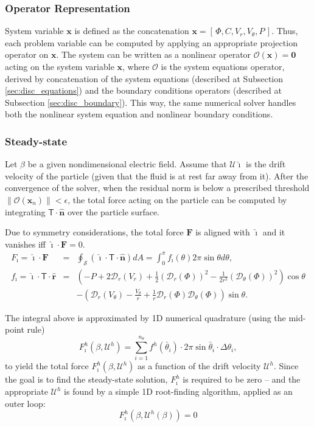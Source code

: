 \documentclass[10pt]{ijnam}
\newcommand{\pars}[1]{\left(#1\right)}
\newcommand\bn{\boldsymbol{\hat{n}}}
\newcommand\bF{\boldsymbol{F}}
\newcommand\bx{\boldsymbol{x}}
\newcommand\br{\boldsymbol{r}}
\newcommand\brhat{\hat{\br}}
\newcommand\bnhat{\hat{\boldsymbol{n}}}
\newcommand\bzero{\boldsymbol{0}}
\newcommand\cO{\mathcal{O}}
\newcommand\cD{\mathcal{D}}
\newcommand\cU{\mathscr{U}}
\newcommand\tT{\mathsf{T}}
\newcommand\ui{\boldsymbol{\hat{\imath}}}
\begin{document}
\subsubsection{Operator Representation}
System variable $\bx$ is defined as the concatenation $\bx = [\,\varPhi, C, V_r, V_\theta, P\,]$.
Thus, each problem variable can be computed by applying an appropriate projection operator on $\bx$.
The system can be written as a nonlinear operator $\cO(\bx) = \bzero$ 
acting on the system variable ${\bx}$, 
where $\cO$ is the system equations operator, 
derived by concatenation of the system equations (described at Subsection \ref{sec:disc_equations})
and the boundary conditions operators (described at Subsection \ref{sec:disc_boundary}).
This way, the same numerical solver handles both the nonlinear system equation and nonlinear
boundary conditions.

\subsubsection{Steady-state}
Let $\beta$ be a given nondimensional electric field.
Assume that $\cU \ui$ is the drift velocity of the particle 
(given that the fluid is at rest far away from it).
After the convergence of the solver, when the residual norm is below
a prescribed threshold $\|\cO(\bx_n)\| < \epsilon$, 
the total force acting on the particle  
can be computed by integrating $\tT \cdot \bn$ over the particle surface.

Due to symmetry considerations, the total force $\bF$ is 
aligned with $\ui$ and it vanishes iff $\ui \cdot \bF = 0$.
\begin{eqnarray} \nonumber
F_\imath = \ui \cdot \bF &=& 
\oint_\mathcal{S} \pars{\ui \cdot \tT \cdot \bnhat} dA = 
\int_0^\pi f_\imath(\theta) 2\pi \sin\theta d\theta ,
\\  
f_\imath = \ui \cdot \tT \cdot \brhat &=& \pars{-P + 2\cD_r(V_r) + 
\frac{1}{2}\pars{\cD_r(\varPhi)}^2 - \frac{1}{2r^2}\pars{\cD_\theta(\varPhi)}^2}\cos\theta 
\\  \nonumber
&& -\pars{\cD_r(V_\theta) - \frac{V_\theta}{r}
+ \frac{1}{r}\cD_r(\varPhi) \cD_{\theta}(\varPhi)}\sin\theta.
\end{eqnarray}

The integral above is approximated by 1D numerical quadrature
(using the mid-point rule)
\begin{equation}
F_\imath^h(\beta, \cU^h) = \sum_{i=1}^{n_\theta} f^h(\bar\theta_i) \cdot 
              2 \pi \sin\bar\theta_i \cdot \Delta\theta_i,
\end{equation}
to yield the total force $F_\imath^h(\beta, \cU^h)$ as a function of the drift velocity $\cU^h$.
Since the goal is to find the steady-state solution, $F_\imath^h$ 
is required to be zero --
and the appropriate $\cU^h$ is found by a simple 1D root-finding algorithm,
applied as an outer loop:
\begin{equation} \label{eq:disc_zero_force}
F_\imath^h(\beta, \cU^h(\beta)) = 0
\end{equation}
\end{document}
